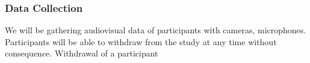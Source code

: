 \subsubsection{Data Collection}
We will be gathering audiovisual data of participants with cameras, microphones.
Participants will be able to withdraw from the study at any time without consequence. 
Withdrawal of a participant